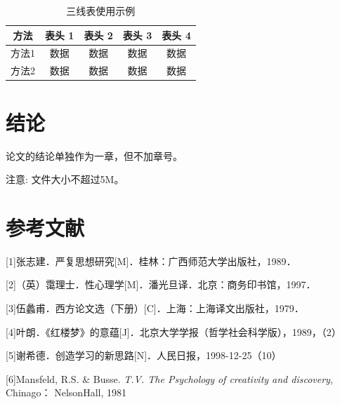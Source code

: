 \documentclass[zihao=-4]{ctexart}
\begin{document}
\begin{spacing}{1.5}
\begin{table}[t]
\begin{tabular}{|l||c|c|c|c|c|c|}
\end{tabular}
\end{table}


\begin{table}[H]
\caption{三线表使用示例}
\centering
\begin{tabular}{ccccc}
\hline  
\textbf{方法} & \textbf{表头 1} & \textbf{表头 2} & \textbf{表头 3} & \textbf{表头 4} \\ 
\hline  
方法1 & 数据  & 数据  & 数据  & 数据\\
方法2 & 数据  & 数据  & 数据  & 数据\\
\hline
\end{tabular} 
\end{table} 

\section*{结论}%
论文的结论单独作为一章，但不加章号。

注意: 文件大小不超过5M。

\end{spacing}

\newpage

\section*{参考文献} %
[1]张志建．严复思想研究[M]．桂林：广西师范大学出版社，1989． 

[2]（英）霭理士．性心理学[M]．潘光旦译．北京：商务印书馆，1997．


[3]伍蠡甫．西方论文选（下册）[C]．上海：上海译文出版社，1979．

[4]叶朗．《红楼梦》的意蕴[J]．北京大学学报（哲学社会科学版），1989，（2）

[5]谢希德．创造学习的新思路[N]．人民日报，1998-12-25（10）

[6]Mansfeld, R.S. \& Busse. \textit{T.V. The Psychology of creativity and discovery}, Chinago：
NelsonHall, 1981




% 
\end{document}
